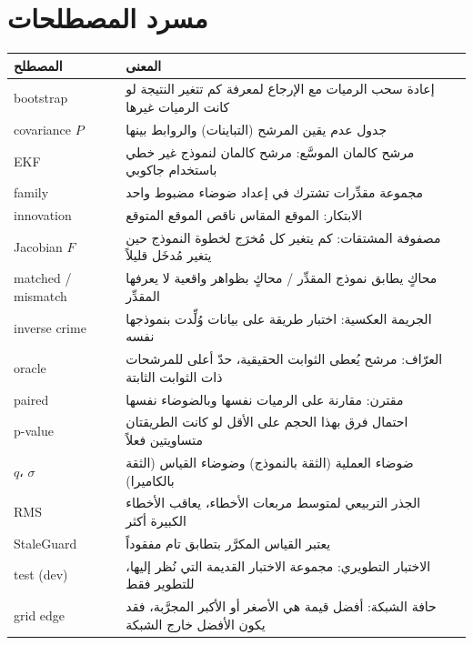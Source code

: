 \documentclass[11pt,a4paper]{article}
\newcommand{\en}[1]{\textenglish{#1}}
\begin{document}
\section{مسرد المصطلحات}
\begin{center}\small
\begin{tabularx}{\linewidth}{@{}l>{\raggedleft\arraybackslash}X@{}}\toprule
المصطلح & المعنى\\\midrule
\en{bootstrap} & إعادة سحب الرميات مع الإرجاع لمعرفة كم تتغير النتيجة لو كانت الرميات غيرها\\
\en{covariance} $P$ & جدول عدم يقين المرشح (التباينات) والروابط بينها\\
\en{EKF} & مرشح كالمان الموسَّع: مرشح كالمان لنموذج غير خطي باستخدام جاكوبي\\
\en{family} & مجموعة مقدِّرات تشترك في إعداد ضوضاء مضبوط واحد\\
\en{innovation} & الابتكار: الموقع المقاس ناقص الموقع المتوقع\\
\en{Jacobian} $F$ & مصفوفة المشتقات: كم يتغير كل مُخرَج لخطوة النموذج حين يتغير مُدخَل قليلاً\\
\en{matched / mismatch} & محاكٍ يطابق نموذج المقدِّر / محاكٍ بظواهر واقعية لا يعرفها المقدِّر\\
\en{inverse crime} & الجريمة العكسية: اختبار طريقة على بيانات وُلِّدت بنموذجها نفسه\\
\en{oracle} & العرّاف: مرشح يُعطى الثوابت الحقيقية، حدّ أعلى للمرشحات ذات الثوابت الثابتة\\
\en{paired} & مقترن: مقارنة على الرميات نفسها وبالضوضاء نفسها\\
\en{p-value} & احتمال فرق بهذا الحجم على الأقل لو كانت الطريقتان متساويتين فعلاً\\
$q$، $\sigma$ & ضوضاء العملية (الثقة بالنموذج) وضوضاء القياس (الثقة بالكاميرا)\\
\en{RMS} & الجذر التربيعي لمتوسط مربعات الأخطاء، يعاقب الأخطاء الكبيرة أكثر\\
\en{StaleGuard} & يعتبر القياس المكرَّر بتطابق تام مفقوداً\\
\en{test (dev)} & الاختبار التطويري: مجموعة الاختبار القديمة التي نُظر إليها، للتطوير فقط\\
\en{grid edge} & حافة الشبكة: أفضل قيمة هي الأصغر أو الأكبر المجرَّبة، فقد يكون الأفضل خارج الشبكة\\\bottomrule
\end{tabularx}\end{center}
\end{document}
